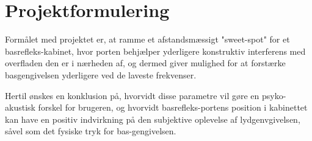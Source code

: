 \chapter{Projektformulering}


Formålet med projektet er, at ramme et afstandsmæssigt "sweet-spot" for et basrefleks-kabinet, hvor porten behjælper yderligere konstruktiv interferens med overfladen den er i nærheden af, og dermed giver mulighed for at forstærke basgengivelsen yderligere ved de laveste frekvenser. 

Hertil ønskes en konklusion på, hvorvidt disse parametre vil gøre en psyko-akustisk forskel for brugeren, og hvorvidt basrefleks-portens position i kabinettet kan have en positiv indvirkning på den subjektive oplevelse af lydgenvgivelsen, såvel som det fysiske tryk for bas-gengivelsen. 



